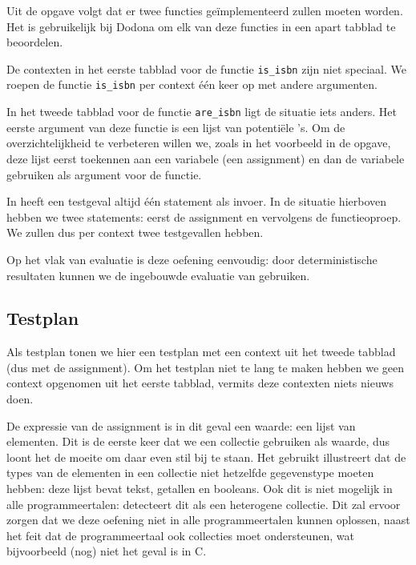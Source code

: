 Uit de opgave volgt dat er twee functies geïmplementeerd zullen moeten worden.
Het is gebruikelijk bij Dodona om elk van deze functies in een apart tabblad te beoordelen.

De contexten in het eerste tabblad voor de functie \texttt{is\_isbn} zijn niet speciaal.
We roepen de functie \texttt{is\_isbn} per context één keer op met andere argumenten.

In het tweede tabblad voor de functie \texttt{are\_isbn} ligt de situatie iets anders.
Het eerste argument van deze functie is een lijst van potentiële 's.
Om de overzichtelijkheid te verbeteren willen we, zoals in het voorbeeld in de opgave, deze lijst eerst toekennen aan een variabele (een assignment) en dan de variabele gebruiken als argument voor de functie.

In \tested{} heeft een testgeval altijd één statement als invoer.
In de situatie hierboven hebben we twee statements: eerst de assignment en vervolgens de functieoproep.
We zullen dus per context twee testgevallen hebben.

Op het vlak van evaluatie is deze oefening eenvoudig: door deterministische resultaten kunnen we de ingebouwde evaluatie van \tested{} gebruiken.

\subsection{Testplan}\label{subsec:oefening-isbn-testplan}

Als testplan tonen we hier een testplan met een context uit het tweede tabblad (dus met de assignment).
Om het testplan niet te lang te maken hebben we geen context opgenomen uit het eerste tabblad, vermits deze contexten niets nieuws doen.

De expressie van de assignment is in dit geval een waarde: een lijst van elementen.
Dit is de eerste keer dat we een collectie gebruiken als waarde, dus loont het de moeite om daar even stil bij te staan.
Het gebruikt illustreert dat de types van de elementen in een collectie niet hetzelfde gegevenstype moeten hebben: deze lijst bevat tekst, getallen en booleans.
Ook dit is niet mogelijk in alle programmeertalen: \tested{} detecteert dit als een heterogene collectie.
Dit zal ervoor zorgen dat we deze oefening niet in alle programmeertalen kunnen oplossen, naast het feit dat de programmeertaal ook collecties moet ondersteunen, wat bijvoorbeeld (nog) niet het geval is in C\@.

\inputminted{json}{sources/isbn-plan.tson}

